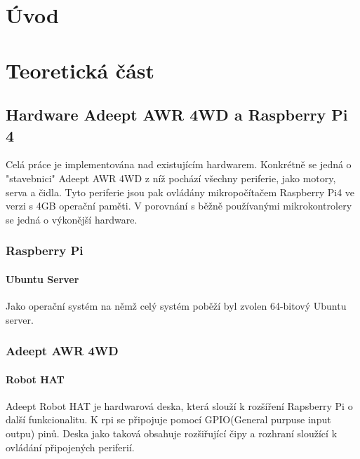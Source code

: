 
%

\chapter{Úvod}

\chapter{Teoretická část} %

\section{Hardware Adeept AWR 4WD a Raspberry Pi 4}
Celá práce je implementována nad existujícím hardwarem. Konkrétně se jedná o "stavebnici" Adeept AWR 4WD z níž pochází všechny periferie, jako motory, serva a čidla. Tyto periferie jsou pak ovládány mikropočítačem Raspberry Pi4 ve verzi s 4GB operační paměti. V porovnání s běžně používanými mikrokontrolery se jedná o výkonější hardware.

\subsection*{Raspberry Pi}


\subsubsection{Ubuntu Server}
Jako operační systém na němž celý systém poběží byl zvolen 64-bitový Ubuntu server.

\subsection*{Adeept AWR 4WD}

\subsubsection*{Robot HAT}
Adeept Robot HAT je hardwarová deska, která slouží k rozšíření Rapsberry Pi o další funkcionalitu. K rpi se připojuje pomocí GPIO(General purpuse input outpu) pinů. Deska jako taková obsahuje rozšiřující čipy a rozhraní sloužící k ovládání připojených periferií.

